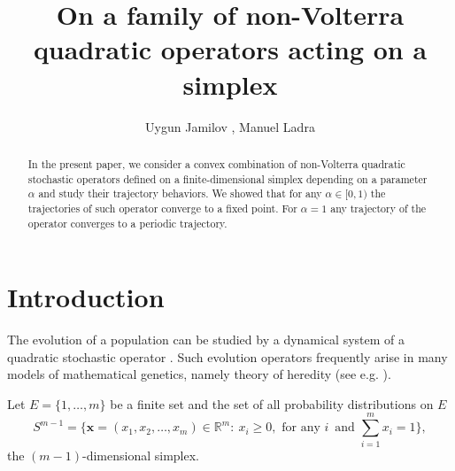 \documentclass[11pt,reqno]{amsart}
\numberwithin{equation}{section} \setcounter{tocdepth}{1}
\begin{document}
\title[On a family of non-Volterra quadratic operators acting on a simplex]{On a family of non-Volterra quadratic operators acting on a simplex}

\author{Uygun Jamilov  ,  Manuel Ladra }

 \address{ U.\ U.\ Jamilov\\ V.I. Romanovskiy Institute of Mathematics,  Uzbekistan Academy of Sciences,
81, Mirzo-Ulugbek str., 100170, Tashkent, Uzbekistan.}

\address{M.\ Ladra\\ University of Santiago de Compostela, 15782, Santiago de Compostela, Spain.}

\begin{abstract}
In the present paper, we consider a convex combination of non-Volterra quadratic
stochastic operators defined on a finite-dimensional simplex depending on a parameter
$\alpha$ and study their trajectory behaviors. We showed that for any $\alpha\in [0,1)$
the trajectories of such operator converge to a fixed point. For $\alpha=1$
any trajectory of the operator converges  to a periodic trajectory.
\end{abstract}



\maketitle


\section{Introduction}

The evolution of a population can be studied by a dynamical system of a quadratic
stochastic operator \cite{L}. Such evolution operators frequently arise in many models of
mathematical genetics, namely theory of heredity (see e.g. \cite{Ber,GGJ,GSN,GZ,Gdan,Gsb,GMR,Jdnc,Jlob,Jjph,JL,JLM,K,L,RZhmn,RZhukr,ZhRsb}).

Let $E =\{1,\dots,m\}$ be a finite set and the set of all probability distributions on $E$
\begin{equation*}
S^{m-1} =\{\mathbf{x} = (x_1, x_2,\dots,x_m)\in \mathbb{R}^m : \ x_i \geq 0, \text{ for any } i  \, \text { and } \sum_{i=1}^m x_i=1\},
\end{equation*}
 the $(m-1)$-dimensional simplex.
\end{document}
